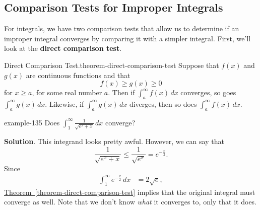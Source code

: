 \documentclass[10pt,]{book}
\newcommand{\terminology}[1]{\textbf{#1}}
\numberwithin{equation}{section}
\begin{document}
\subsection[{Comparison Tests for Improper Integrals}]{Comparison Tests for Improper Integrals}\label{subsection-comparison-tests-for-improper-integrals}
\hypertarget{p-602}{}%
For integrals, we have two comparison tests that allow us to determine if an improper integral converges by comparing it with a simpler integral. First, we'll look at the \terminology{direct comparison test}.%
\begin{theorem}{Direct Comparison Test.}{}{theorem-direct-comparison-test}%
\hypertarget{p-603}{}%
Suppose that \(f(x)\) and \(g(x)\) are continuous functions and that%
\begin{equation*}
f(x) \geq g(x) \geq 0
\end{equation*}
for \(x\geq a\), for some real number \(a\). Then if \(\int_{a}^{\infty}f(x)\,dx\) converges, so goes \(\int_{a}^{\infty}g(x)\,dx\). Likewise, if \(\int_{a}^{\infty}g(x)\,dx\) diverges, then so does \(\int_{a}^{\infty}f(x)\,dx\).%
\end{theorem}
\begin{example}{}{example-135}%
\hypertarget{p-604}{}%
Does \(\int_{1}^{\infty}\frac{1}{\sqrt{e^{x} + x}}\,dx\) converge?%
\par\smallskip%
\noindent\textbf{Solution}.\hypertarget{solution-131}{}\quad%
\hypertarget{p-605}{}%
This integrand looks pretty awful. However, we can say that%
\begin{equation*}
\frac{1}{\sqrt{e^{x} + x}} \leq \frac{1}{\sqrt{e^{x}}} = e^{-\frac{x}{2}}.
\end{equation*}
Since%
\begin{align*}
\int_{1}^{\infty}e^{-\frac{x}{2}}\,dx & = 2\sqrt{e}, 
\end{align*}
\hyperref[theorem-direct-comparison-test]{Theorem~\ref{theorem-direct-comparison-test}} implies that the original integral must converge as well. Note that we don't know \emph{what} it converges to, only that it does.%
\end{example}
\end{document}
